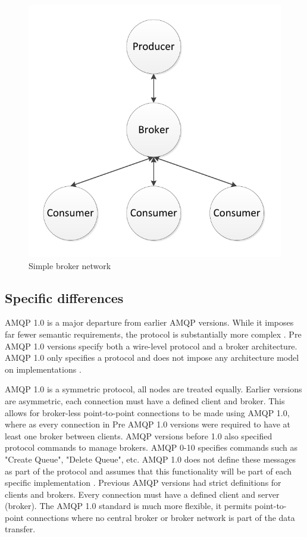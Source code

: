 \documentclass{thesis}
\begin{document}
\begin{figure}[h]
\centering
\includegraphics[scale=.75]{simple_fanout}  
\caption{Simple broker network}
\end{figure}

\subsection {Specific differences}

AMQP 1.0 is a major departure from earlier AMQP versions.  While it imposes far fewer semantic requirements, the protocol is substantially more complex \cite{RABBITMQ_PROTOCOLS}.  Pre AMQP 1.0 versions specify both a  wire-level protocol and a broker architecture.  AMQP 1.0 only specifies a protocol and does not impose any architecture model on implementations \cite{REDHAT1}.

AMQP 1.0 is a symmetric protocol, all nodes are treated equally.  Earlier versions are asymmetric, each connection must have a defined client and broker.  This allows for broker-less point-to-point connections to be made using AMQP 1.0, where as every connection in Pre AMQP 1.0 versions were required to have at least one broker between clients.  AMQP versions before 1.0 also specified protocol commands to manage brokers.  AMQP 0-10 specifies commands such as "Create Queue", "Delete Queue", etc.  AMQP 1.0 does not define these messages as part of the protocol and assumes that this functionality will be part of each specific implementation \cite{REDHAT1}.  Previous AMQP versions had strict definitions for clients and brokers.  Every connection must have a defined client and server (broker).  The AMQP 1.0 standard is much more flexible, it permits point-to-point connections where no central broker or broker network is part of the data transfer.  
\end{document}
